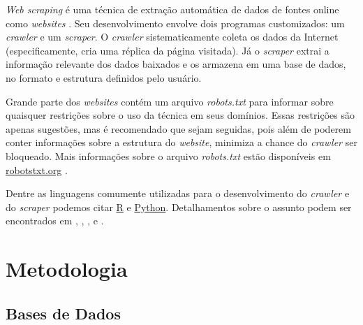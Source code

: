 \documentclass{automatextcc}
\begin{document}

\textit{Web scraping} é uma técnica de extração automática de dados de fontes online como \textit{websites} \citep{farley2017,khder2021}. Seu desenvolvimento envolve dois programas customizados: um \textit{crawler} e um \textit{scraper}. O \textit{crawler} sistematicamente coleta os dados da Internet (especificamente, cria uma réplica da página visitada). Já o \textit{scraper} extrai a informação relevante dos dados baixados e os armazena em uma base de dados, no formato e estrutura definidos pelo usuário. \citep{lawson2015,patil2016}

Grande parte dos \textit{websites} contém um arquivo \textit{robots.txt} para informar sobre quaisquer restrições sobre o uso da técnica em seus domínios. Essas restrições são apenas sugestões, mas é recomendado que sejam seguidas, pois além de poderem conter informações sobre a estrutura do \textit{website}, minimiza a chance do \textit{crawler} ser bloqueado. Mais informações sobre o arquivo \textit{robots.txt} estão disponíveis em \url{robotstxt.org} \citep{lawson2015}.

Dentre as linguagens comumente utilizadas para o desenvolvimento do \textit{crawler} e do \textit{scraper} podemos citar \href{https://cran.r-project.org}{R} e \href{https://python.org/}{Python}. Detalhamentos sobre o assunto podem ser encontrados em \citet{lawson2015}, \citet{sirisuriya2015}, \citet{patil2016}, \citet{farley2017} e \citet{khder2021}.



\chapter{Metodologia}

\section{Bases de Dados}
\end{document}
